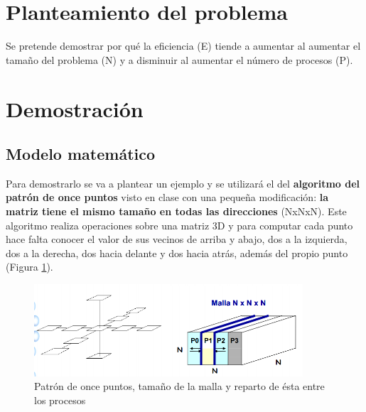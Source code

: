 \newpage %

\tableofcontents %

\listoffigures

\newpage


\section{Planteamiento del problema}

Se pretende demostrar por qué la eficiencia (E) tiende a aumentar al aumentar el tamaño del problema (N) y a disminuir al aumentar el número de procesos (P).

\section{Demostración}

\subsection{Modelo matemático}

Para demostrarlo se va a plantear un ejemplo y se utilizará el del \textbf{algoritmo del patrón de once puntos} visto en clase con una pequeña modificación: \textbf{la matriz tiene el mismo tamaño en todas las direcciones} (NxNxN). Este algoritmo realiza operaciones sobre una matriz 3D y para computar cada punto hace falta conocer el valor de sus vecinos de arriba y abajo, dos a la izquierda, dos a la derecha, dos hacia delante y dos hacia atrás, además del propio punto (Figura \ref{fig:oncePuntos}).

\begin{figure}[H]
	\centering
	\includegraphics[width=10cm]{imagenes/oncePuntos}
	\caption{Patrón de once puntos, tamaño de la malla y reparto de ésta entre los procesos}
	\label{fig:oncePuntos}
\end{figure}

